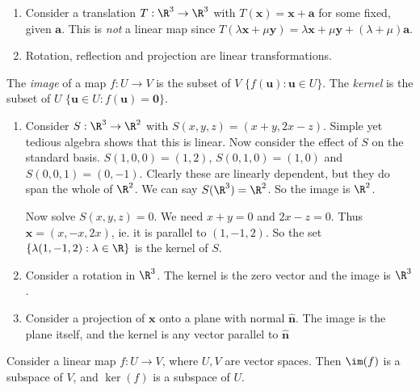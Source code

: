 \documentclass[a4paper]{article}
\begin{document}
\begin{eg}\leavevmode
  \begin{enumerate}
    \item Consider a translation $T:\R^3 \to \R^3$ with $T(\mathbf{x}) = \mathbf{x + a}$ for some fixed, given $\mathbf{a}$. This is \emph{not} a linear map since $T(\lambda\mathbf{x} + \mu\mathbf{y}) = \lambda \mathbf{x} + \mu \mathbf{y} + (\lambda + \mu)\mathbf{a}$.
    \item Rotation, reflection and projection are linear transformations.
  \end{enumerate}
\end{eg}

\begin{defi}
  The \emph{image} of a map $f: U\to V$ is the subset of $V$ $\{f(\mathbf{u}): \mathbf{u}\in U\}$. The \emph{kernel} is the subset of $U$ $\{\mathbf{u}\in U: f(\mathbf{u}) = \mathbf{0}\}$.
\end{defi}

\begin{eg}\leavevmode
  \begin{enumerate}
    \item Consider $S: \R^3 \to \R^2$ with $S(x, y, z) = (x + y, 2x - z)$. Simple yet tedious algebra shows that this is linear.
      Now consider the effect of $S$ on the standard basis. $S(1, 0, 0) = (1, 2)$, $S(0, 1, 0) = (1, 0)$ and $S(0, 0, 1) = (0, -1)$. Clearly these are linearly dependent, but they do span the whole of $\R^2$. We can say $S(\R^3) = \R^2$. So the image is $\R^2$.

      Now solve $S(x, y, z) = 0$. We need $x + y = 0$ and $2x - z = 0$. Thus $\mathbf{x} = (x, -x, 2x)$, ie. it is parallel to $(1, -1, 2)$. So the set $\{\lambda(1, -1, 2):\lambda\in \R\}$ is the kernel of $S$.
    \item Consider a rotation in $\R^3$. The kernel is the zero vector and the image is $\R^3$.
    \item Consider a projection of $\mathbf{x}$ onto a plane with normal $\mathbf{\hat n}$. The image is the plane itself, and the kernel is any vector parallel to $\mathbf{\hat n}$
  \end{enumerate}
\end{eg}

\begin{thm}
  Consider a linear map $f: U\to V$, where $U, V$ are vector spaces. Then $\im (f)$ is a subspace of $V$, and $\ker (f)$ is a subspace of $U$.
\end{thm}
\end{document}
